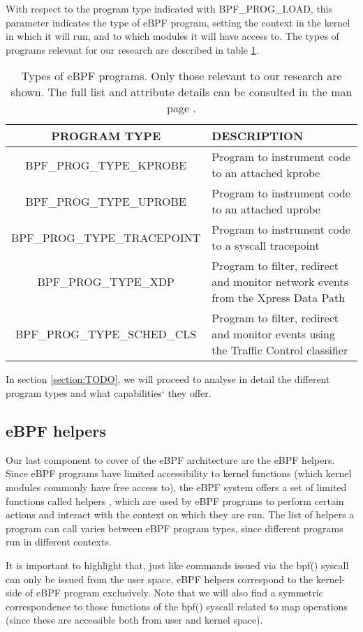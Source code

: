 With respect to the program type indicated with BPF\_PROG\_LOAD, this parameter indicates the type of eBPF program, setting the context in the kernel in which it will run, and to which modules it will have access to. The types of programs relevant for our research are described in table \ref{table:ebpf_prog_types}.

\begin{table}[htbp]
\begin{tabular}{|c|>{\centering\arraybackslash}p{5cm}|}
\hline
PROGRAM TYPE & DESCRIPTION\\
\hline
\hline
BPF\_PROG\_TYPE\_KPROBE & Program to instrument code to an attached kprobe\\
\hline
BPF\_PROG\_TYPE\_UPROBE & Program to instrument code to an attached uprobe\\
\hline
BPF\_PROG\_TYPE\_TRACEPOINT & Program to instrument code to a syscall tracepoint\\
\hline
BPF\_PROG\_TYPE\_XDP & Program to filter, redirect and monitor network events from the Xpress Data Path\\
\hline
BPF\_PROG\_TYPE\_SCHED\_CLS & Program to filter, redirect and monitor events using the Traffic Control classifier\\
\hline
\end{tabular}
\caption{Types of eBPF programs. Only those relevant to our research are shown. The full list and attribute details can be consulted in the man page \cite{bpf_syscall}.}
\label{table:ebpf_prog_types}
\end{table}

In section \ref{section:TODO}, we will proceed to analyse in detail the different program types and what capabilities` they offer.

\subsection{eBPF helpers} \label{subsection:ebpf_helpers}
Our last component to cover of the eBPF architecture are the eBPF helpers. Since eBPF programs have limited accessibility to kernel functions (which kernel modules commonly have free access to), the eBPF system offers a set of limited functions called helpers \cite{ebpf_helpers}, which are used by eBPF programs to perform certain actions and interact with the context on which they are run. The list of helpers a program can call varies between eBPF program types, since different programs run in different contexts.

It is important to highlight that, just like commands issued via the bpf() syscall can only be issued from the user space, eBPF helpers correspond to the kernel-side of eBPF program exclusively. Note that we will also find a symmetric correspondence to those functions of the bpf() syscall related to map operations (since these are accessible both from user and kernel space).

